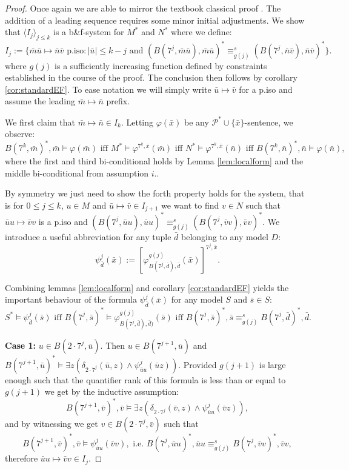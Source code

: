 \documentclass{lmcs} %
\newcommand{\?}{\ensuremath{\mkern0.4\thinmuskip}}
\let\phi=\varphi
\newcommand{\CP}{\mathcal{P}}
\begin{document}
\begin{proof}
    Once again we are able to mirror the textbook classical proof \cite[Theorem 1.5.1]{EbbinghausFlum95:Finmodeltheory}. The addition of a leading sequence requires some minor initial adjustments. We show that $\langle I_j\rangle_{j\leq k}$ is a b\&f-system for $M^\ast$ and $N^\ast$ where we define:\[I_j:=\{\bar{m}\bar{u}\mapsto\bar{n}\bar{v}\text{ p.iso}:|\bar{u}|\leq k-j\text{ and }(B(7^j,\bar{m}\bar{u}),\bar{m}\bar{u})^\ast\equiv^s_{g(j)}(B(7^j,\bar{n}\bar{v}),\bar{n}\bar{v})^\ast\}.\]
    where $g(j)$ is a sufficiently increasing function defined by constraints established in the course of the proof. The conclusion then follows by corollary \ref{cor:standardEF}. To ease notation we will simply write $\bar{u}\mapsto\bar{v}$ for a p.iso and assume the leading $\bar{m}\mapsto\bar{n}$ prefix.  

    We first claim that $\bar{m}\mapsto\bar{n}\in I_k$. Letting $\phi(\bar{x})$ be any $\CP^\ast\cup\{\bar{x}\}$-sentence, we observe:\[B(7^k,\bar{m})^\ast,\bar{m}\models\phi(\bar{m})\text{ iff }M^\ast\models\phi^{7^k,\bar{x}}(\bar{m})\text{ iff }N^\ast\models\phi^{7^k,\bar{x}}(\bar{n})\text{ iff }B(7^k,\bar{n})^\ast,\bar{n}\models\phi(\bar{n}),\]
    where the first and third bi-conditional holds by Lemma \ref{lem:localform} and the middle bi-conditional from assumption $i.$.

    By symmetry we just need to show the forth property holds for the system, that is for $0\leq j\leq k$, $u\in M$ and $\bar{u}\mapsto\bar{v}\in I_{j+1}$ we want to find $v\in N$ such that $\bar{u}u\mapsto\bar{v}v$ is a p.iso and $(B(7^j,\bar{u}u),\bar{u}u)^\ast\equiv^s_{g(j)} (B(7^j,\bar{v}v),\bar{v}v)^\ast$. We introduce a useful abbreviation for any tuple $\bar{d}$ belonging to any model $D$:\[\psi^j_{\bar{d}}(\bar{x}):=[\phi^{g(j)}_{B(7^j,\bar{d}),\bar{d}}(\bar{x})]^{7^j,\bar{x}}.\]
    
    Combining lemmas \ref{lem:localform} and corollary \ref{cor:standardEF} yields the important behaviour of the formula $\psi^j_{\bar{d}}(\bar{x})$ for any model $S$ and $\bar{s}\in S$: \[S^\ast\models\psi^j_{\bar{d}}(\bar{s})\text{ iff }B(7^j,\bar{s})^\ast\models\phi^{g(j)}_{B(7^j,\bar{d}),\bar{d})}(\bar{s})\text{ iff }B(7^j,\bar{s})^\ast,\bar{s}\equiv^s_{g(j)} B(7^j,\bar{d})^\ast,\bar{d}.\]

    \noindent
    \textbf{Case 1:}
    $u\in B(2\cdot 7^j,\bar{u})$. Then $u\in B(7^{j+1},\bar{u})$ and $B(7^{j+1},\bar{u})^\ast\models \exists z(\delta_{2\cdot7^j}(\bar{u},z)\land\psi^j_{\bar{u}u}(\bar{u}z))$. Provided $g(j+1)$ is large enough such that the quantifier rank of this formula is less than or equal to $g(j+1)$ we get by the inductive assumption:\[B(7^{j+1},\bar{v})^\ast,\bar{v}\models\exists z(\delta_{2\cdot 7^j}(\bar{v},z)\land \psi^j_{\bar{u}u}(\bar{v}z)),\] and by witnessing we get $v\in B(2\cdot 7^j,\bar{v})$ such that \[B(7^{j+1},\bar{v})^\ast,\bar{v}\models\psi^j_{\bar{u}u}(\bar{v}v),\text{ i.e. }B(7^j,\bar{u}u)^\ast,\bar{u}u\equiv^s_{g(j)} B(7^j,\bar{v}v)^\ast,\bar{v}v,\] therefore $\bar{u}u\mapsto\bar{v}v\in I_j$.


\end{proof}
\end{document}
